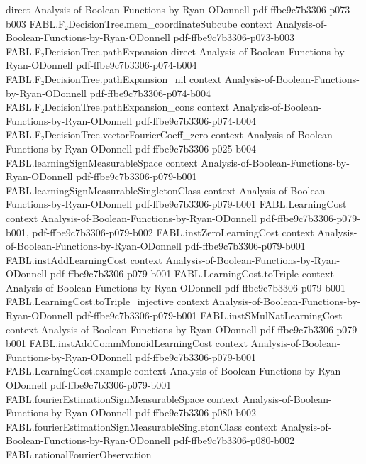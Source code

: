\begin{theorem}
  {direct}
  {Analysis-of-Boolean-Functions-by-Ryan-ODonnell}
  {pdf-ffbe9c7b3306-p073-b003}
\proofstep
  {FABL.F₂DecisionTree.mem_coordinateSubcube}
  {context}
  {Analysis-of-Boolean-Functions-by-Ryan-ODonnell}
  {pdf-ffbe9c7b3306-p073-b003}
\proofstep
  {FABL.F₂DecisionTree.pathExpansion}
  {direct}
  {Analysis-of-Boolean-Functions-by-Ryan-ODonnell}
  {pdf-ffbe9c7b3306-p074-b004}
\proofstep
  {FABL.F₂DecisionTree.pathExpansion_nil}
  {context}
  {Analysis-of-Boolean-Functions-by-Ryan-ODonnell}
  {pdf-ffbe9c7b3306-p074-b004}
\proofstep
  {FABL.F₂DecisionTree.pathExpansion_cons}
  {context}
  {Analysis-of-Boolean-Functions-by-Ryan-ODonnell}
  {pdf-ffbe9c7b3306-p074-b004}
\proofstep
  {FABL.F₂DecisionTree.vectorFourierCoeff_zero}
  {context}
  {Analysis-of-Boolean-Functions-by-Ryan-ODonnell}
  {pdf-ffbe9c7b3306-p025-b004}
\proofstep
  {FABL.learningSignMeasurableSpace}
  {context}
  {Analysis-of-Boolean-Functions-by-Ryan-ODonnell}
  {pdf-ffbe9c7b3306-p079-b001}
\proofstep
  {FABL.learningSignMeasurableSingletonClass}
  {context}
  {Analysis-of-Boolean-Functions-by-Ryan-ODonnell}
  {pdf-ffbe9c7b3306-p079-b001}
\proofstep
  {FABL.LearningCost}
  {context}
  {Analysis-of-Boolean-Functions-by-Ryan-ODonnell}
  {pdf-ffbe9c7b3306-p079-b001,
    pdf-ffbe9c7b3306-p079-b002}
\proofstep
  {FABL.instZeroLearningCost}
  {context}
  {Analysis-of-Boolean-Functions-by-Ryan-ODonnell}
  {pdf-ffbe9c7b3306-p079-b001}
\proofstep
  {FABL.instAddLearningCost}
  {context}
  {Analysis-of-Boolean-Functions-by-Ryan-ODonnell}
  {pdf-ffbe9c7b3306-p079-b001}
\proofstep
  {FABL.LearningCost.toTriple}
  {context}
  {Analysis-of-Boolean-Functions-by-Ryan-ODonnell}
  {pdf-ffbe9c7b3306-p079-b001}
\proofstep
  {FABL.LearningCost.toTriple_injective}
  {context}
  {Analysis-of-Boolean-Functions-by-Ryan-ODonnell}
  {pdf-ffbe9c7b3306-p079-b001}
\proofstep
  {FABL.instSMulNatLearningCost}
  {context}
  {Analysis-of-Boolean-Functions-by-Ryan-ODonnell}
  {pdf-ffbe9c7b3306-p079-b001}
\proofstep
  {FABL.instAddCommMonoidLearningCost}
  {context}
  {Analysis-of-Boolean-Functions-by-Ryan-ODonnell}
  {pdf-ffbe9c7b3306-p079-b001}
\proofstep
  {FABL.LearningCost.example}
  {context}
  {Analysis-of-Boolean-Functions-by-Ryan-ODonnell}
  {pdf-ffbe9c7b3306-p079-b001}
\proofstep
  {FABL.fourierEstimationSignMeasurableSpace}
  {context}
  {Analysis-of-Boolean-Functions-by-Ryan-ODonnell}
  {pdf-ffbe9c7b3306-p080-b002}
\proofstep
  {FABL.fourierEstimationSignMeasurableSingletonClass}
  {context}
  {Analysis-of-Boolean-Functions-by-Ryan-ODonnell}
  {pdf-ffbe9c7b3306-p080-b002}
\proofstep
  {FABL.rationalFourierObservation}

\end{theorem}
